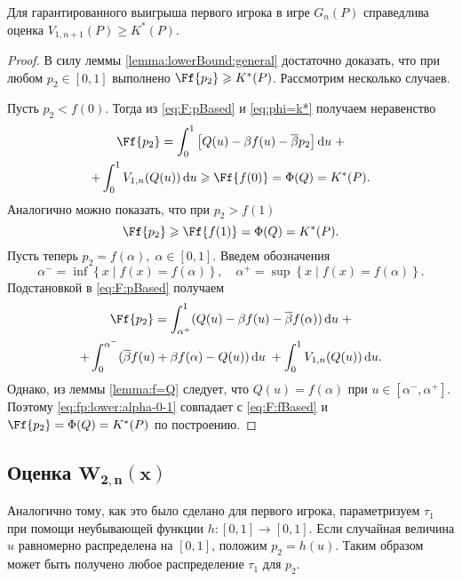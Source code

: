 \begin{theorem}\label{theorem:V:bound}
  Для гарантированного выигрыша первого игрока в игре $G_n(P)$ справедлива
  оценка $V_{1,n+1}(P) \geqslant K^*(P).$
\end{theorem}
\begin{proof}
  В силу леммы \ref{lemma:lowerBound:general} достаточно доказать, что при любом
  $p_2 \in [0, 1]$ выполнено $\Ff{p_2} \geqslant K^*(P)$. Рассмотрим несколько
  случаев.

  Пусть $p_2 < f(0)$. Тогда из \eqref{eq:F:pBased} и \eqref{eq:phi=k*} получаем
  неравенство
  \begin{multline*}
    \Ff{p_2} = \int_0^1 \left[ Q(u) - \Co f(u) - \DCo p_2
    \right] \di u \; + \\
    + \int_0^1 V_{1,n}(Q(u)) \di u \geqslant \Ff{f(0)} = \Phi(Q) = K^*(P).
  \end{multline*}
  Аналогично можно показать, что при $p_2 > f(1)$
  \begin{equation*}
    \Ff{p_2} \geqslant \Ff{f(1)} = \Phi(Q) = K^*(P).
  \end{equation*}
  Пусть теперь $p_2 = f(\alpha), \; \alpha \in [0, 1]$. Введем обозначения
  \[
    \alpha^- = \inf \left\{ x \;|\; f(x) = f(\alpha) \right\}, \quad \alpha^+ =
    \sup \left\{ x \;|\; f(x) = f(\alpha) \right\}.
  \]
  Подстановкой в \eqref{eq:F:pBased} получаем
  \begin{multline}\label{eq:fp:lower:alpha-0-1}
    \Ff{p_2} =
    \int_{\alpha^+}^1  (Q(u) - \Co f(u) - \DCo f(\alpha)) \di u \; + \\
    + \int_0^{\alpha^-} (\DCo f(u) + \Co f(\alpha) - Q(u)) \di u \; + \int_0^1
    V_{1,n}(Q(u)) \di u.
  \end{multline}
  Однако, из леммы \ref{lemma:f=Q} следует, что $Q(u) = f(\alpha)$ при $u \in
  [\alpha^-, \alpha^+]$. Поэтому \eqref{eq:fp:lower:alpha-0-1} совпадает с
  \eqref{eq:F:fBased} и $\Ff{p_2} = \Phi(Q) = K^*(P)$ по построению.
\end{proof}

\subsection{Оценка $\mathbf{W_{2,n}\left(x\right)}$}\label{sec:-dual-game-estimate}
Аналогично тому, как это было сделано для первого игрока, параметризуем $\tau_1$
при помощи неубывающей функции $h: [0, 1] \rightarrow [0, 1]$. Если случайная
величина $u$ равномерно распределена на $[0, 1]$, положим $p_2 = h(u)$. Таким
образом может быть получено любое распределение $\tau_1$ для $p_2$.


